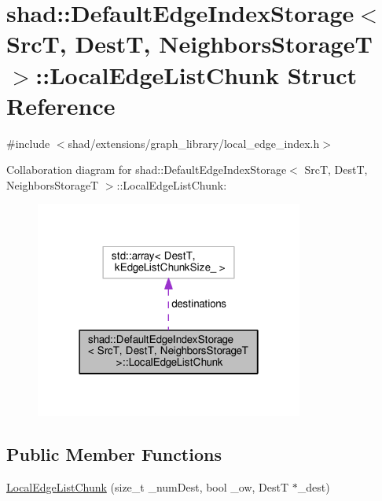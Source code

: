 \hypertarget{structshad_1_1DefaultEdgeIndexStorage_1_1LocalEdgeListChunk}{\section{shad\-:\-:Default\-Edge\-Index\-Storage$<$ Src\-T, Dest\-T, Neighbors\-Storage\-T $>$\-:\-:Local\-Edge\-List\-Chunk Struct Reference}
\label{structshad_1_1DefaultEdgeIndexStorage_1_1LocalEdgeListChunk}
}


{\ttfamily \#include $<$shad/extensions/graph\-\_\-library/local\-\_\-edge\-\_\-index.\-h$>$}



Collaboration diagram for shad\-:\-:Default\-Edge\-Index\-Storage$<$ Src\-T, Dest\-T, Neighbors\-Storage\-T $>$\-:\-:Local\-Edge\-List\-Chunk\-:
\nopagebreak
\begin{figure}[H]
\begin{center}
\leavevmode
\includegraphics[width=250pt]{structshad_1_1DefaultEdgeIndexStorage_1_1LocalEdgeListChunk__coll__graph}
\end{center}
\end{figure}
\subsection*{Public Member Functions}
\begin{DoxyCompactItemize}
\item 
\hyperlink{structshad_1_1DefaultEdgeIndexStorage_1_1LocalEdgeListChunk_a536a899e890ea5b51805efbf4c5ab8d6}{Local\-Edge\-List\-Chunk} (size\-\_\-t \-\_\-num\-Dest, bool \-\_\-ow, Dest\-T $\ast$\-\_\-dest)
\end{DoxyCompactItemize}
